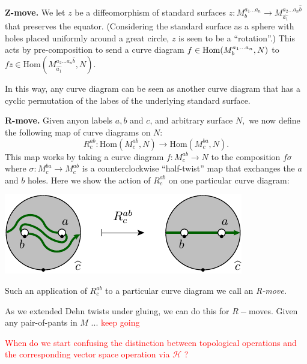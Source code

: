 \documentclass[aps, prl, letterpaper, twocolumn, superscriptaddress, notitlepage, 10pt]{revtex4-1}
\newcommand{\simon}[1]{\textcolor{red}{#1}}
\newcommand{\F}{\mathscr{H}} %
\newcommand{\Hom}{{\mathrm{Hom}}}
\newcommand{\subsub}[1]{{\bf #1}}
\begin{document}
\subsub{Z-move.}
We let $z$ be a diffeomorphism of standard surfaces 
$z : M^{a_1...a_n}_{b} \to  M^{a_2...a_n\widehat{b}}_{\widehat{a_1}}$
that preserves the equator.
(Considering the standard surface as a sphere with holes
placed uniformly around a great circle, $z$ is seen to
be a ``rotation''.)
This acts by pre-composition to
send a curve diagram $f\in \Hom(\StdM, N)$ to 
$fz \in \Hom(M^{a_2...a_n\widehat{b}}_{\widehat{a_1}}, N).$

In this way, any curve diagram can be seen as another
curve diagram that has a cyclic permutation of the labes of
the underlying standard surface.

\subsub{R-move.}
Given anyon labels $a, b$ and $c$, and arbitrary
surface $N,$
we now define the following map of curve diagrams on $N:$
$$R^{ab}_c: \Hom(M^{ab}_c, N)\to \Hom(M^{ba}_c, N).$$
This map works by taking a curve diagram 
$f:M^{ab}_c\to N$ to the composition $f\sigma$ where
$\sigma:M^{ba}_c\to M^{ab}_c$
is a counterclockwise ``half-twist'' map that exchanges
the $a$ and $b$ holes.
Here we show the action of $R^{ab}_c$ on one particular curve diagram:
\begin{center}
\includegraphics[]{pic-rmove-1.pdf}
\end{center}
Such an application of $R^{ab}_c$ to a particular
curve diagram we call an \emph{R-move.}

As we extended Dehn twists under gluing,
we can do this for $R-$moves.
Given any pair-of-pants in $M$ ... \simon{keep going}

\simon{When do we start confusing the distinction between
topological operations and the corresponding vector space
operation via $\F$ ?}
\end{document}
